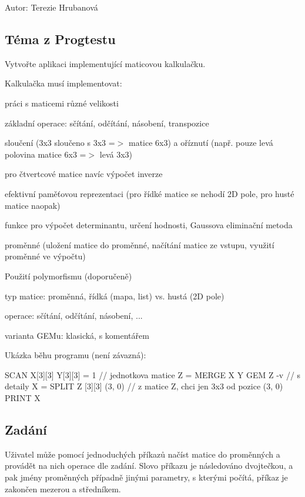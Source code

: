 Autor\+: Terezie Hrubanová

\subsection*{Téma z Progtestu}

Vytvořte aplikaci implementující maticovou kalkulačku.

Kalkulačka musí implementovat\+:
\begin{DoxyEnumerate}
\item práci s maticemi různé velikosti
\item základní operace\+: sčítání, odčítání, násobení, transpozice
\item sloučení (3x3 sloučeno s 3x3 =$>$ matice 6x3) a oříznutí (např. pouze levá polovina matice 6x3 =$>$ levá 3x3)
\item pro čtvertcové matice navíc výpočet inverze
\item efektivní paměťovou reprezentaci (pro řídké matice se nehodí 2D pole, pro husté matice naopak)
\item funkce pro výpočet determinantu, určení hodnosti, Gaussova eliminační metoda
\item proměnné (uložení matice do proměnné, načítání matice ze vstupu, využití proměnné ve výpočtu)
\end{DoxyEnumerate}

Použití polymorfismu (doporučeně)


\begin{DoxyItemize}
\item typ matice\+: proměnná, řídká (mapa, list) vs. hustá (2D pole)
\item operace\+: sčítání, odčítání, násobení, ...
\item varianta G\+E\+Mu\+: klasická, s komentářem
\end{DoxyItemize}

Ukázka běhu programu (není závazná)\+: \begin{DoxyVerb}SCAN X[3][3]
Y[3][3] = 1 // jednotkova matice
Z = MERGE X Y
GEM Z -v // s detaily
X = SPLIT Z [3][3] (3, 0) // z matice Z, chci jen 3x3 od pozice (3, 0)
PRINT X
\end{DoxyVerb}


\subsection*{Zadání}

Uživatel může pomocí jednoduchých příkazů načíst matice do proměnných a provádět na nich operace dle zadání. Slovo příkazu je následováno dvojtečkou, a pak jmény proměnných případně jinými parametry, s kterými počítá, příkaz je zakončen mezerou a středníkem.


